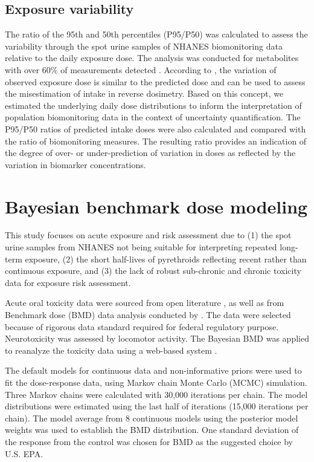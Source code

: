 \documentclass[toxics,article,submit,pdftex,moreauthors]{Definitions/mdpi}
\begin{document}
\subsection{Exposure variability}\label{exposure-variability}

The ratio of the 95th and 50th percentiles (P95/P50) was calculated to
assess the variability through the spot urine samples of NHANES
biomonitoring data relative to the daily exposure dose. The analysis was
conducted for metabolites with over 60\% of measurements detected
\citep{faure_evaluation_2020}. According to
\citet{aylward_interpreting_2012}, the variation of observed exposure
dose is similar to the predicted dose and can be used to assess the
misestimation of intake in reverse dosimetry. Based on this concept, we
estimated the underlying daily dose distributions to inform the
interpretation of population biomonitoring data in the context of
uncertainty quantification. The P95/P50 ratios of predicted intake doses were
also calculated and compared with the ratio of biomonitoring measures.
The resulting ratio provides an indication of the degree of over- or
under-prediction of variation in doses as reflected by the variation in
biomarker concentrations.

\section{Bayesian benchmark dose
modeling}\label{bayesian-benchmark-dose-modeling}

This study focuses on acute exposure and risk assessment due to (1) the
spot urine samples from NHANES not being suitable for interpreting
repeated long-term exposure, (2) the short half-lives of pyrethroids
reflecting recent rather than continuous exposure, and (3) the lack of
robust sub-chronic and chronic toxicity data for exposure risk
assessment.

Acute oral toxicity data were sourced from open literature
\citep{wolansky_relative_2006}, as well as from Benchmark dose (BMD)
data analysis conducted by \citet{us2018der}.
The data were selected because of rigorous data standard required for
federal regulatory purpose. Neurotoxicity was assessed by locomotor
activity. The Bayesian BMD was applied to reanalyze the toxicity data
using a web-based system \citep{shao_kan_web_2018}.

The default models for continuous data and non-informative priors were
used to fit the dose-response data, using Markov chain Monte Carlo
(MCMC) simulation. Three Markov chains were calculated with 30,000
iterations per chain. The model distributions were estimated using the
last half of iterations (15,000 iterations per chain). The model average
from 8 continuous models using the posterior model weights was used to
establish the BMD distribution. One standard deviation of the response
from the control was chosen for BMD as the suggested choice by U.S. EPA.
\end{document}
